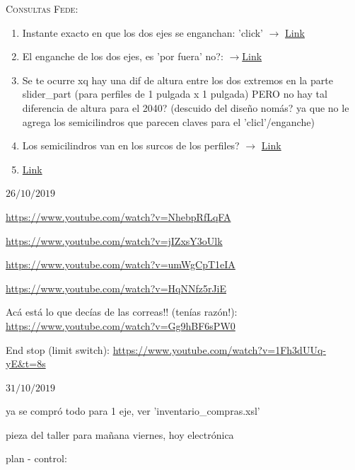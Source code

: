 \documentclass[12pt,dvipsnames]{exam}
\begin{document}
\hrulefill



\textsc{Consultas Fede:}

\begin{enumerate}
	\item  Instante exacto en que los dos ejes se enganchan: 'click' $\xrightarrow{}$  \href{https://youtu.be/mks6Ju9jcFo?t=892}{Link}
	\item El enganche de los dos ejes, es 'por fuera' no?: $\xrightarrow{}$\href{https://youtu.be/mks6Ju9jcFo?t=1483}{Link}
	\item Se te ocurre xq hay una dif de altura entre los dos extremos en la parte slider\_part (para perfiles de 1 pulgada x 1 pulgada) PERO no hay tal diferencia de altura para el 2040? (descuido del diseño nomás? ya que no le agrega los semicilindros que parecen claves para el 'clicl'/enganche)
	
	\item Los semicilindros van en los surcos de los perfiles? $\xrightarrow{}$  \href{https://cdn.instructables.com/FQR/M932/JH0TJHRY/FQRM932JH0TJHRY.LARGE.jpg?auto=webp&width=1024&fit=bounds}{Link}
	\item \href{https://cdn.instructables.com/FVR/OPPF/JGQTDJ1N/FVROPPFJGQTDJ1N.LARGE.jpg?auto=webp&width=1024&fit=bounds}{Link}
\end{enumerate}



\hrulefill

$26/10/2019$


\url{https://www.youtube.com/watch?v=NhebpRfLqFA}

\url{https://www.youtube.com/watch?v=jIZxsY3oUlk}

\url{https://www.youtube.com/watch?v=umWgCpT1eIA}

\url{https://www.youtube.com/watch?v=HqNNfz5rJiE}

Acá está lo que decías de las correas!! (tenías razón!): \url{https://www.youtube.com/watch?v=Gg9hBF6sPW0}


End stop (limit switch): \url{https://www.youtube.com/watch?v=1Fh3dUUq-yE&t=8s}



\hrulefill

$31/10/2019$

ya se compró todo para 1 eje, ver 'inventario\_compras.xsl'

pieza del taller para mañana viernes, hoy electrónica

plan - control:
\end{document}
